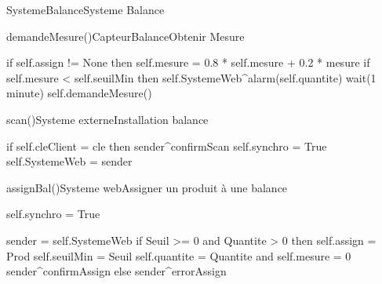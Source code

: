 \begin{OM}{SystemeBalance}{Systeme Balance}
    \begin{OMOperation}{demandeMesure()}{CapteurBalance}{Obtenir Mesure}
        \begin{OMMessages}
        \end{OMMessages}

        \begin{OMPre}
        \end{OMPre}

        \begin{OMPost}
if self.assign != None then
    self.mesure = 0.8 * self.mesure + 0.2 * mesure
if self.mesure < self.seuilMin then
    self.SystemeWeb^alarm(self.quantite)
wait(1 minute)
self.demandeMesure()
        \end{OMPost}
    \end{OMOperation}

    \begin{OMOperation}{scan()}{Systeme externe}{Installation balance}
        \begin{OMMessages}
        \end{OMMessages}

        \begin{OMPre}
        \end{OMPre}

        \begin{OMPost}
if self.cleClient = cle then
sender^confirmScan
self.synchro = True
self.SystemeWeb = sender
        \end{OMPost}
    \end{OMOperation}

    \begin{OMOperation}{assignBal()}{Systeme web}{Assigner un produit à une balance}
        \begin{OMMessages}
        \end{OMMessages}

        \begin{OMPre}
self.synchro = True
        \end{OMPre}

        \begin{OMPost}
sender = self.SystemeWeb
if Seuil >= 0 and Quantite > 0 then
    self.assign = Prod
    self.seuilMin = Seuil
    self.quantite = Quantite and
    self.mesure = 0
    sender^confirmAssign
else
    sender^errorAssign
        \end{OMPost}
    \end{OMOperation}


\end{OM}
